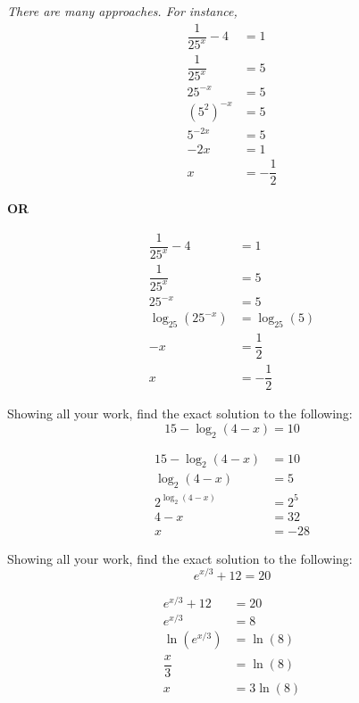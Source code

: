 \documentclass[12pt,letterpaper]{exam}
\begin{document}
\begin{questions}
{\itshape There are many approaches. For instance, \pspace
	\[
	\begin{aligned}
	\dfrac{1}{25^x} - 4&= 1 \\[0.5cm]
	\dfrac{1}{25^x}&= 5 \\[0.5cm]
	25^{-x}&= 5 \\[0.5cm]
	(5^2)^{-x}&= 5 \\[0.5cm]
	5^{-2x}&= 5 \\[0.5cm]
	-2x&= 1 \\[0.5cm]
	x&= -\dfrac{1}{2}
	\end{aligned}
	\] \pspace
	
	\begin{center} {\bfseries OR} \end{center}
	
	\[
	\begin{aligned}
	\dfrac{1}{25^x} - 4&= 1 \\[0.5cm]
	\dfrac{1}{25^x}&= 5 \\[0.5cm]
	25^{-x}&= 5 \\[0.5cm]
	\log_{25}(25^{-x})&= \log_{25}(5) \\[0.5cm]
	-x&= \dfrac{1}{2} \\[0.5cm]
	x&= -\dfrac{1}{2}
	\end{aligned}
	\] 
}



\newpage
\question[10] Showing all your work, find the exact solution to the following:  
	\[
	15 - \log_2(4 - x)= 10
	\] \pvspace{1.3cm}

	\[
	\begin{aligned}
	15 - \log_2(4 - x)&= 10 \\[0.5cm]
	\log_2(4 - x)&= 5 \\[0.5cm]
	2^{\log_2(4 - x)}&= 2^5 \\[0.5cm]
	4 - x&= 32 \\[0.5cm]
	x&= -28
	\end{aligned}
	\]



\newpage
\question[10] Showing all your work, find the exact solution to the following: 
	\[
	e^{x/3} + 12= 20
	\] \pvspace{1.3cm}

	\[
	\begin{aligned}
	e^{x/3} + 12&= 20 \\[0.5cm]
	e^{x/3}&= 8 \\[0.5cm]
	\ln(e^{x/3})&= \ln(8) \\[0.5cm]
	\dfrac{x}{3}&= \ln(8) \\[0.5cm]
	x&= 3 \ln(8)
	\end{aligned}
	\]




\end{questions}
\end{document}
